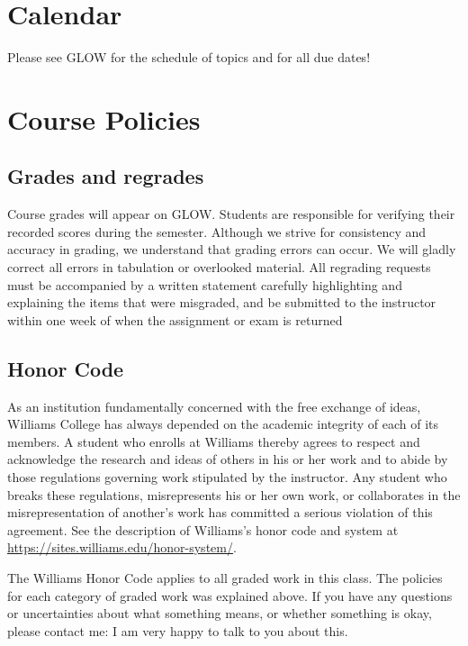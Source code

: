 \documentclass[11pt]{article}
\begin{document}
 
\section{Calendar}

Please see GLOW for the schedule of topics and for all due dates! 

\section{Course Policies}

\subsection{Grades and regrades}

Course grades will appear on GLOW. Students are responsible for verifying their recorded scores during the semester. Although we strive for consistency and accuracy in grading, we understand that grading errors can occur. We will gladly correct all errors in tabulation or overlooked material. All regrading requests must be accompanied by a written statement carefully highlighting and
explaining the items that were misgraded, and be submitted to the instructor within one week of when the assignment or exam is returned

\subsection{Honor Code}

As an institution fundamentally concerned with the free exchange of ideas, Williams College has
always depended on the academic integrity of each of its members. A student who enrolls at
Williams thereby agrees to respect and acknowledge the research and ideas of others in his or her
work and to abide by those regulations governing work stipulated by the instructor. Any student
who breaks these regulations, misrepresents his or her own work, or collaborates in the misrepresentation of another's work has committed a serious violation of this agreement. See the description of Williams's honor code and system at \url{https://sites.williams.edu/honor-system/}.

The Williams Honor Code applies to all graded work in this class. The policies for each category of graded work was explained above. If you have any questions or uncertainties about what something means, or whether something is okay, please contact me: I am very happy to talk to you about this.
\end{document}
